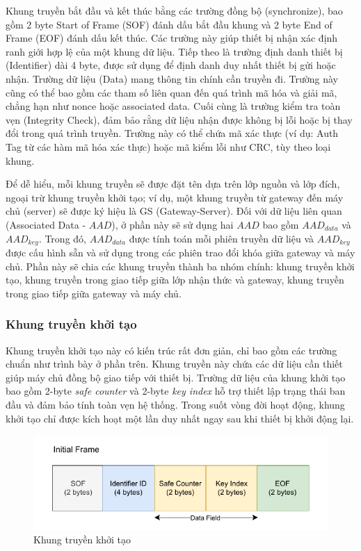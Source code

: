 Khung truyền bắt đầu và kết thúc bằng các trường đồng bộ (synchronize), bao gồm 2 byte Start of Frame (SOF) đánh dấu bắt đầu khung và 2 byte End of Frame (EOF) đánh dấu kết thúc. Các trường này giúp thiết bị nhận xác định ranh giới hợp lệ của một khung dữ liệu.
Tiếp theo là trường định danh thiết bị (Identifier) dài 4 byte, được sử dụng để định danh duy nhất thiết bị gửi hoặc nhận.
Trường dữ liệu (Data) mang thông tin chính cần truyền đi. Trường này cũng có thể bao gồm các tham số liên quan đến quá trình mã hóa và giải mã, chẳng hạn như nonce hoặc associated data.
Cuối cùng là trường kiểm tra toàn vẹn (Integrity Check), đảm bảo rằng dữ liệu nhận được không bị lỗi hoặc bị thay đổi trong quá trình truyền. Trường này có thể chứa mã xác thực (ví dụ: Auth Tag từ các hàm mã hóa xác thực) hoặc mã kiểm lỗi như CRC, tùy theo loại khung.

Để dễ hiểu, mỗi khung truyền sẽ được đặt tên dựa trên lớp nguồn và lớp đích, ngoại trừ khung truyền khởi tạo; ví dụ, một khung truyền từ gateway đến máy chủ (server) sẽ được ký hiệu là GS (Gateway-Server). Đối với dữ liệu liên quan (Associated Data - $AAD$), ở phần này sẽ sử dụng hai $AAD$ bao gồm $AAD_{data}$ và $AAD_{key}$. Trong đó, $AAD_{data}$ được tính toán mỗi phiên truyền dữ liệu và $AAD_{key}$ được cấu hình sẵn và sử dụng trong các phiên trao đổi khóa giữa gateway và máy chủ. Phần này sẽ chia các khung truyền thành ba nhóm chính: khung truyền khởi tạo, khung truyền trong giao tiếp giữa lớp nhận thức và gateway, khung truyền trong giao tiếp giữa gateway và máy chủ.
\subsubsection{Khung truyền khởi tạo}
Khung truyền khởi tạo này có kiến trúc rất đơn giản, chỉ bao gồm các trường chuẩn như trình bày ở phần trên. Khung truyền này chứa các dữ liệu cần thiết giúp máy chủ đồng bộ giao tiếp với thiết bị. Trường dữ liệu của khung khởi tạo bao gồm 2-byte \textit{safe counter} và 2-byte \textit{key index} hỗ trợ thiết lập trạng thái ban đầu và đảm bảo tính toàn vẹn hệ thống. Trong suốt vòng đời hoạt động, khung khởi tạo chỉ được kích hoạt một lần duy nhất ngay sau khi thiết bị khởi động lại.
\begin{figure}[H]
    \centering
    \includegraphics[width=0.6\linewidth]{init-frame.pdf}
    \caption{Khung truyền khởi tạo}
    \label{fig:init-frame}
\end{figure}
